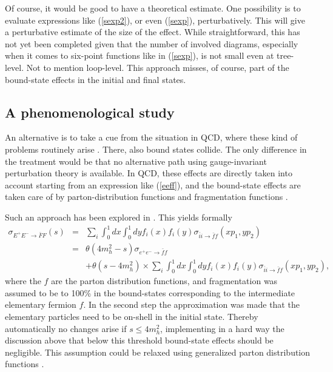 \documentclass[final,twoside,12pt]{article}
\newcommand*{\no}{\noindent}
\newcommand*{\bea}{\begin{eqnarray}}
\newcommand*{\eea}{\end{eqnarray}}
\newcommand*{\pref}[1]{(\ref{#1})}
\newcommand*{\nn}{\nonumber}
\newcommand*{\1}{1\!\!\!\bot}
\begin{document}
Of course, it would be good to have a theoretical estimate. One possibility is to evaluate expressions like \pref{sexp2}, or even \pref{sexp}, perturbatively. This will give a perturbative estimate of the size of the effect. While straightforward, this has not yet been completed \cite{Maas:unpublished} given that the number of involved diagrams, especially when it comes to six-point functions like in \pref{sexp}, is not small even at tree-level. Not to mention loop-level. This approach misses, of course, part of the bound-state effects in the initial and final states.

\subsection{A phenomenological study}\label{ss:pheno}

An alternative is to take a cue from the situation in QCD, where these kind of problems routinely arise \cite{BeiglboCk:2006lfa,Bohm:2001yx,Dissertori:2003pj,Brodsky:2010an}. There, also bound states collide. The only difference in the treatment would be that no alternative path using gauge-invariant perturbation theory is available. In QCD, these effects are directly taken into account starting from an expression like \pref{eeff}, and the bound-state effects are taken care of by parton-distribution functions and fragmentation functions \cite{BeiglboCk:2006lfa,Bohm:2001yx,Dissertori:2003pj}.

Such an approach has been explored in \cite{Egger:2017tkd}. This yields formally
\bea
\sigma_{E^+E^-\to\bar{F}F}(s)&=&\sum_i\int_0^1 dx\int_0^1 dy f_i(x) f_i(y)\sigma_{\bar{i}i\to\bar{f}f}(xp_1,yp_2)\label{pdf}\\
&=&\theta(4m_h^2-s)\sigma_{e^+e^-\to\bar{f}f}\nn\\
&&+\theta(s-4m_h^2)\times\sum_i\int_0^1 dx\int_0^1 dy f_i(x) f_i(y)\sigma_{\bar{i}i\to\bar{f}f}(xp_1,yp_2)\nn,
\eea
\no where the $f$ are the parton distribution functions, and fragmentation was assumed to be to 100\% in the bound-states corresponding to the intermediate elementary fermion $f$. In the second step the approximation was made that the elementary particles need to be on-shell in the initial state. Thereby automatically no changes arise if $s\le 4m_h^2$, implementing in a hard way the discussion above that below this threshold bound-state effects should be negligible. This assumption could be relaxed using generalized parton distribution functions \cite{Lorce:2013pza,Diehl:2015uka}.
\end{document}
